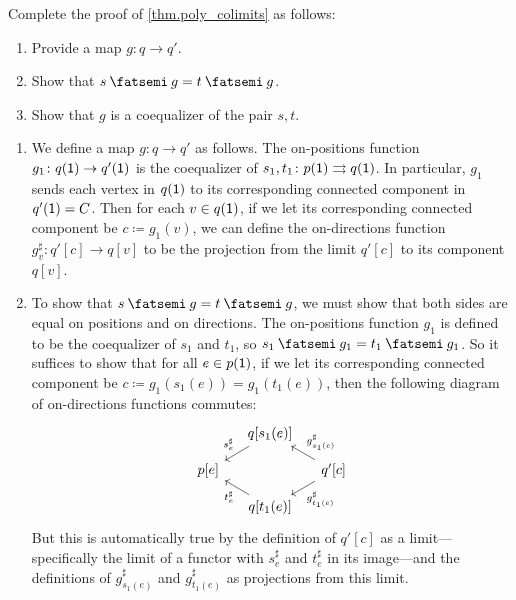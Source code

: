\documentclass[Book-Poly]{subfiles}
\begin{document}
\begin{exercise}\label{exc.poly_colimits}
Complete the proof of \cref{thm.poly_colimits} as follows:
\begin{enumerate}
	\item Provide a map $g \colon q \to q'$.
	\item Show that $s \then g = t \then g$.
	\item Show that $g$ is a coequalizer of the pair $s, t$.
\qedhere
\end{enumerate}
\begin{solution}
\begin{enumerate}
    \item We define a map $g \colon q \to q'$ as follows.
    The on-positions function $g_1 \colon q(\textsf{1}) \to q'(\textsf{1})$ is the coequalizer of $s_1, t_1 \colon p(\textsf{1}) \rightrightarrows q(\textsf{1})$.
    In particular, $g_1$ sends each vertex in $q(\textsf{1})$ to its corresponding connected component in $q'(\textsf{1}) = C$.
    Then for each $v \in q(\textsf{1})$, if we let its corresponding connected component be $c \coloneqq g_1(v)$, we can define the on-directions function $g^\sharp_v \colon q'[c] \to q[v]$ to be the projection from the limit $q'[c]$ to its component $q[v]$.
    
    \item To show that $s \then g = t \then g$, we must show that both sides are equal on positions and on directions.
    The on-positions function $g_1$ is defined to be the coequalizer of $s_1$ and $t_1$, so $s_1 \then g_1 = t_1 \then g_1$.
    So it suffices to show that for all $e \in p(\textsf{1})$, if we let its corresponding connected component be $c \coloneqq g_1(s_1(e)) = g_1(t_1(e))$, then the following diagram of on-directions functions commutes:
    \[
    \begin{tikzcd}[sep=small]
        & q[s_1(e)] \ar[dl, "s^\sharp_e"'] \\
        p[e] & & q'[c] \ar[ul, "g^\sharp_{s_1(e)}"'] \ar[dl, "g^\sharp_{t_1(e)}"] \\
        & q[t_1(e)] \ar[ul, "t^\sharp_e"]
    \end{tikzcd}
    \]
    But this is automatically true by the definition of $q'[c]$ as a limit---specifically the limit of a functor with $s^\sharp_e$ and $t^\sharp_e$ in its image---and the definitions of $g^\sharp_{s_1(e)}$ and $g^\sharp_{t_1(e)}$ as projections from this limit.
    

\end{enumerate}
\end{solution}
\end{exercise}
\end{document}

